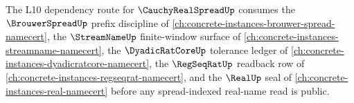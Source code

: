 The L10 dependency route for $\CauchyRealSpreadUp$ consumes the $\BrouwerSpreadUp$ prefix discipline of \autoref{ch:concrete-instances-brouwer-spread-namecert}, the $\StreamNameUp$ finite-window surface of \autoref{ch:concrete-instances-streamname-namecert}, the $\DyadicRatCoreUp$ tolerance ledger of \autoref{ch:concrete-instances-dyadicratcore-namecert}, the $\RegSeqRatUp$ readback row of \autoref{ch:concrete-instances-regseqrat-namecert}, and the $\RealUp$ seal of \autoref{ch:concrete-instances-real-namecert} before any spread-indexed real-name read is public.
